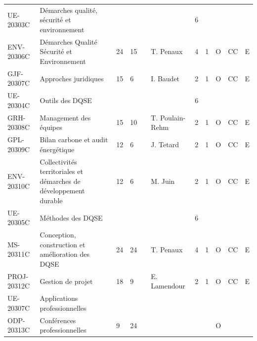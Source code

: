 \documentclass[a4paper,11pt]{article}
\begin{document}
{{\begin{tabular}{lllllllllll}
\rowcolor[HTML]{C0C0C0} 
UE-20303C     & Démarches qualité, sécurité et environnement                      &    &    &    &                 & 6    &      &             &                &           \\
ENV-20306C    & Démarches Qualité Sécurité et Environnement                       & 24 & 15 &    & T. Penaux       & 4    & 1    & O           & CC             & E         \\
GJF-20307C    & Approches juridiques                                              & 15 & 6  &    & I. Baudet       & 2    & 1    & O           & CC             & E         \\
\rowcolor[HTML]{C0C0C0} 
UE-20304C     & Outils des DQSE                                                   &    &    &    &                 & 6    &      &             &                &           \\
GRH-20308C    & Management des équipes                                            & 15 & 10 &    & T. Poulain-Rehm & 2    & 1    & O           & CC             & E         \\
GPL-20309C    & Bilan carbone et audit énergétique                                & 12 & 6  &    & J. Tetard       & 2    & 1    & O           & CC             & E         \\
ENV-20310C    & Collectivités territoriales et démarches de développement durable & 12 & 6  &    & M. Juin         & 2    & 1    & O           & CC             & E         \\
\rowcolor[HTML]{C0C0C0} 
UE-20305C     & Méthodes des DQSE                                                 &    &    &    &                 & 6    &      &             &                &           \\
MS-20311C     & Conception, construction et amélioration des DQSE                 & 24 & 24 &    & T. Penaux       & 4    & 1    & O           & CC             & E         \\
PROJ-20312C   & Gestion de projet                                                 & 18 & 9  &    & E. Lamendour    & 2    & 1    & O           & CC             & E         \\
\rowcolor[HTML]{C0C0C0} 
UE-20307C     & Applications professionnelles                                     &    &    &    &                 &      &      &             &                &           \\
ODP-20313C    & Conférences professionnelles                                      & 9  & 24 &    &                 &      &      & O           &                &           \\

\end{tabular}}}
\end{document}
